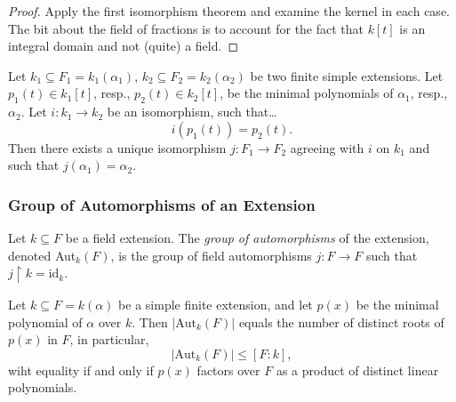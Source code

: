 \begin{proof}
Apply the first isomorphism theorem and examine the kernel in each case. The bit about the field of fractions
is to account for the fact that $k[t]$ is an integral domain and not (quite) a field.
\end{proof}

\begin{proposition}
Let $k_1 \subseteq F_1 = k_1(\alpha_1)$, $k_2 \subseteq F_2 = k_2(\alpha_2)$ be two finite simple
extensions. Let $p_1(t) \in k_1[t]$, resp., $p_2(t) \in k_2[t]$, be the minimal polynomials of $\alpha_1$,
resp., $\alpha_2$. Let $i : k_1 \rightarrow k_2$ be an isomorphism, such that\dots
$$i(p_1(t)) = p_2(t).$$
Then there exists a unique isomorphism $j : F_1 \rightarrow F_2$ agreeing with $i$ on $k_1$ and such that
$j(\alpha_1) = \alpha_2$.
\end{proposition}

\subsubsection{Group of Automorphisms of an Extension}\label{grpautomorphismext}

Let $k \subseteq F$ be a field extension. The \emph{group of automorphisms} of the extension,
denoted Aut$_k(F)$, is the group of field automorphisms $j : F \rightarrow F$ such that $j \upharpoonright k = \textrm{id}_k$.

\begin{corollary}
Let $k \subseteq F = k(\alpha)$ be a simple finite extension, and let $p(x)$ be the minimal polynomial of $\alpha$
over $k$. Then $|\textrm{Aut}_k(F)|$ equals the number of distinct roots of $p(x)$ in $F$, in particular,
$$|\textrm{Aut}_k(F)| \leq [F : k],$$
wiht equality if and only if $p(x)$ factors over $F$ as a product of distinct linear polynomials.
\end{corollary}